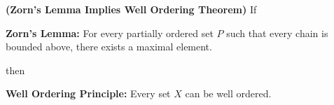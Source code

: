 \documentclass{report}
\begin{document}
\begin{theorem}
\label{2.3.13}
\textbf{(Zorn's Lemma Implies Well Ordering Theorem)}  
If
\begin{center}
    \begin{minipage}{0.9\linewidth}  
        \centering
        \textbf{Zorn's Lemma:} For every partially ordered set $P$ such that every chain is bounded above, there exists a maximal element.
    \end{minipage}
\end{center}
then
\begin{center}
    \begin{minipage}{0.9\linewidth}  
        \centering
       \textbf{Well Ordering Principle:} Every set $X$ can be well ordered.
    \end{minipage}
\end{center}
\end{theorem}
\end{document}
